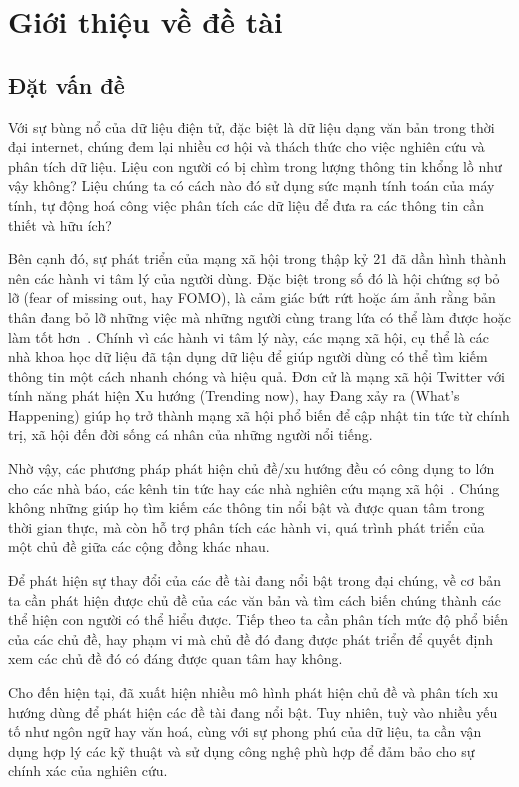 \section{Giới thiệu về đề tài}
\label{sec:introduction}

\subsection{Đặt vấn đề}
Với sự bùng nổ của dữ liệu điện tử, đặc biệt là dữ liệu dạng văn bản trong thời
đại internet, chúng đem lại nhiều cơ hội và thách thức cho việc nghiên cứu và
phân tích dữ liệu. Liệu con người có bị chìm trong lượng thông tin khổng lồ như
vậy không? Liệu chúng ta có cách nào đó sử dụng sức mạnh tính toán của máy
tính, tự động hoá công việc phân tích các dữ liệu để đưa ra các thông tin cần
thiết và hữu ích?

Bên cạnh đó, sự phát triển của mạng xã hội trong thập kỷ 21 đã dần hình thành
nên các hành vi tâm lý của người dùng. Đặc biệt trong số đó là hội chứng sợ bỏ
lỡ (fear of missing out, hay FOMO), là cảm giác bứt rứt hoặc ám ảnh rằng bản
thân đang bỏ lỡ những việc mà những người cùng trang lứa có thể làm được hoặc
làm tốt hơn~\cite{jwtintelligenceFearMissingOut2015}. Chính vì các hành vi tâm
lý này, các mạng xã hội, cụ thể là các nhà khoa học dữ liệu đã tận dụng dữ liệu
để giúp người dùng có thể tìm kiếm thông tin một cách nhanh chóng và hiệu quả.
Đơn cử là mạng xã hội Twitter với tính năng phát hiện Xu hướng (Trending now),
hay Đang xảy ra (What's Happening) giúp họ trở thành mạng xã hội phổ biến để
cập nhật tin tức từ chính trị, xã hội đến đời sống cá nhân của những người nổi
tiếng.

Nhờ vậy, các phương pháp phát hiện chủ đề/xu hướng đều có công dụng to lớn cho
các nhà báo, các kênh tin tức hay các nhà nghiên cứu mạng xã
hội~\cite{madaniRealtimeTrendingTopics2015}. Chúng không những giúp họ tìm kiếm
các thông tin nổi bật và được quan tâm trong thời gian thực, mà còn hỗ trợ phân
tích các hành vi, quá trình phát triển của một chủ đề giữa các cộng đồng khác
nhau.

Để phát hiện sự thay đổi của các đề tài đang nổi bật trong đại chúng, về cơ bản
ta cần phát hiện được chủ đề của các văn bản và tìm cách biến chúng thành các
thể hiện con người có thể hiểu được. Tiếp theo ta cần phân tích mức độ phổ biến
của các chủ đề, hay phạm vi mà chủ đề đó đang được phát triển để quyết định
xem các chủ đề đó có đáng được quan tâm hay không.

Cho đến hiện tại, đã xuất hiện nhiều mô hình phát hiện chủ đề và phân tích xu
hướng dùng để phát hiện các đề tài đang nổi bật. Tuy nhiên, tuỳ vào nhiều yếu
tố như ngôn ngữ hay văn hoá, cùng với sự phong phú của dữ liệu, ta cần vận dụng
hợp lý các kỹ thuật và sử dụng công nghệ phù hợp để đảm bảo cho sự chính xác
của nghiên cứu.

